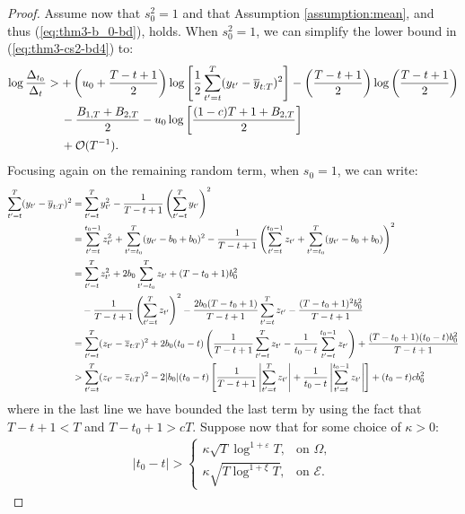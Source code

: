 \begin{proof}
Assume now that $s_0^2 = 1$ and that Assumption \ref{assumption:mean}, and thus (\ref{eq:thm3-b_0-bd}), holds. When $s_0^2 = 1$, we can simplify the lower bound in (\ref{eq:thm3-cs2-bd4}) to:
\begin{align}
    \log \frac{\Delta_{t_0}}{\Delta_t} &> + \left(u_0 + \frac{T - t +1}{2}\right)\log\left[ \frac{1}{2}\sum_{t'=t}^T (y_{t'} - \overline{y}_{t:T})^2 \right] - \left(\frac{T - t + 1}{2}\right) \log\left(\frac{T-t+1}{2}\right)\notag\\
    &\quad\: - \frac{B_{1,T} + B_{2,T}}{2}  - u_0\log\left[\frac{(1-c)T + 1 + B_{2,T}}{2}\right] \notag \\
    &\quad\: +  \mathcal{O}(T^{-1}). \label{eq:thm3-cs2-bd7}
\end{align}
Focusing again on the remaining random term, when $s_0 = 1$, we can write:
\small
\begin{align}
    \sum_{t'=t}^T (y_{t'} - \overline{y}_{t:T})^2 &= \sum_{t'=t}^T y^2_{t'} - \frac{1}{T-t+1}\left(\sum_{t'=t}^T y_{t'} \right)^2 \notag \\
    &= \sum_{t'=t}^{t_0-1} z^2_{t'} + \sum_{t'=t_0}^T (y_{t'} - b_0 + b_0)^2 - \frac{1}{T-t+1}\left(\sum_{t'=t}^{t_0-1} z_{t'} + \sum_{t'=t_0}^T (y_{t'} - b_0 + b_0)\right)^2 \notag \\
    &= \sum_{t'=t}^T z^2_{t'} + 2b_0\sum_{t'=t_0}^T z_{t'} + (T - t_0 + 1)b_0^2 \notag \\
    &\quad - \frac{1}{T-t+1}\left(\sum_{t'=t}^T z_{t'} \right)^2  - \frac{2b_0(T-t_0+1)}{T-t+1}\sum_{t'=t}^T z_{t'} - \frac{(T-t_0+1)^2b_0^2}{T-t+1} \notag \\
    &=  \sum_{t'=t}^T (z_{t'} - \overline{z}_{t:T})^2 + 2b_0(t_0-t)\left(\frac{1}{T-t+1} \sum_{t'=t}^T z_{t'} - \frac{1}{t_0-t}\sum_{t' = t}^{t_0 - 1} z_{t'}\right) + \frac{(T-t_0+1)(t_0-t)b_0^2}{T-t+1} \notag \\
    &> \sum_{t'=t}^T (z_{t'} - \overline{z}_{t:T})^2 - 2|b_0|(t_0-t)\left[\frac{1}{T-t+1} \left|\sum_{t'=t}^T z_{t'}\right| + \frac{1}{t_0-t}\left|\sum_{t' = t}^{t_0 - 1} z_{t'}\right|\right] + (t_0-t)cb_0^2 \label{eq:thm3-cs2-bd8}
\end{align}
\normalsize
where in the last line we have bounded the last term by using the fact that $T-t+1 < T$ and $T-t_0 + 1 > cT$. Suppose now that for some choice of $\kappa > 0$:
\begin{align*}
    |t_0 -t| > 
    \begin{cases}
        \kappa \sqrt{T}\log^{1+\varepsilon} T, & \text{on } \Omega, \\
        \kappa \sqrt{T\log^{1+\xi} T}, & \text{on } \mathcal{E}.

\end{cases}
\end{align*}
\end{proof}
